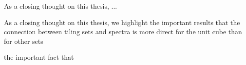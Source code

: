 \documentclass[../thesis.tex]{subfiles}
\begin{document}
As a closing thought on this thesis, ... 

As a closing thought on this thesis, we highlight the important results that the connection between tiling sets and spectra is more direct for the unit cube than for other sets 


the important fact that  





\end{document}
